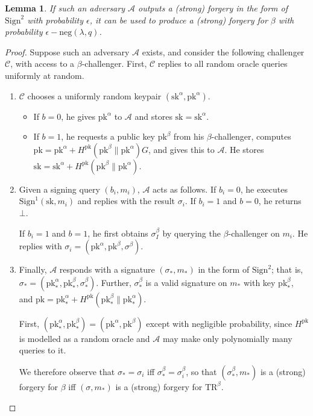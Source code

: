 \documentclass[letterpaper]{article}
\newtheorem{lmma}{Lemma}
\newcommand{\TR}[1]{\mathrm{TR}^{#1}}
\newcommand{\Sign}{\mathrm{Sign}}
\newcommand{\sk}{\mathrm{sk}}
\newcommand{\pk}{\mathrm{pk}}
\newcommand{\negl}{\mathrm{neg}}
\begin{document}
\begin{lmma} If such an adversary $\mathcal{A}$ outputs a (strong) forgery in
the form of $\Sign^2$ with probability $\epsilon$, it can be used to produce a
(strong) forgery for $\beta$ with probability $\epsilon-\negl(\lambda,q)$.
\end{lmma}

\begin{proof} Suppose such an adversary $\mathcal{A}$ exists, and consider the
following challenger $\mathcal{C}$, with access to a $\beta$-challenger. First, $\mathcal{C}$ replies to all random
oracle queries uniformly at random.
\begin{enumerate}
\item $\mathcal{C}$ chooses a uniformly random keypair $(\sk^\alpha, \pk^\alpha)$.
\begin{itemize}
\item If $b=0$, he gives $\pk^\alpha$ to $\mathcal{A}$ and stores $\sk=\sk^\alpha$.
\item If $b=1$, he requests a public key $\pk^\beta$ from his $\beta$-challenger,
computes $\pk=\pk^\alpha+ H^\pk(\pk^\beta\|\pk^\alpha)G$, and gives this to $\mathcal{A}$.
He stores $\sk=\sk^\alpha+H^\pk(\pk^\beta\|\pk^\alpha)$.
\end{itemize}

\item Given a signing query $(b_i,m_i)$, $\mathcal{A}$ acts as follows. If $b_i=0$,
he executes $\Sign^1(\sk,m_i)$ and replies with the result $\sigma_i$. If $b_i=1$ and
$b=0$, he returns $\bot$.

If $b_i=1$ and $b=1$, he first obtains $\sigma^\beta_I$ by querying the
$\beta$-challenger on $m_i$. He replies with $\sigma_i=(\pk^\alpha,\pk^\beta,\sigma^\beta)$.

\item Finally, $\mathcal{A}$ responds with a signature $(\sigma_*, m_*)$ in the
form of $\Sign^2$; that is, $\sigma_* = (\pk^\alpha_*, \pk^\beta_*, \sigma^\beta_*)$.
Further, $\sigma^\beta_*$ is a valid signature on $m_*$
with key $\pk^\beta_*$, and $\pk = \pk^\alpha_* + H^\pk(\pk^\beta_*\|\pk^\alpha_*)$.

First, $(\pk^\alpha_*, \pk^\beta_*) = (\pk^\alpha, \pk^\beta)$ except with negligible
probability, since $H^\pk$ is modelled as a random oracle and $\mathcal{A}$ may make
only polynomially many queries to it.

We therefore observe that $\sigma_* = \sigma_i$ iff $\sigma^\beta_* = \sigma^\beta_i$, so that
$(\sigma^\beta_*, m_*)$ is a (strong) forgery for $\beta$ iff $(\sigma, m_*)$ is a
(strong) forgery for $\TR\beta$.
\end{enumerate}
\end{proof}
\end{document}

